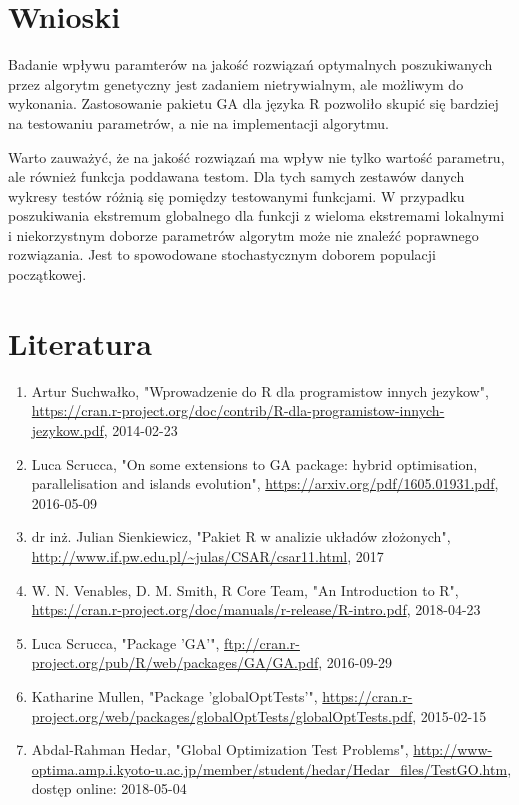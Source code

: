 \documentclass{article}
\begin{document}
\section{Wnioski}

Badanie wpływu paramterów na jakość rozwiązań optymalnych poszukiwanych przez algorytm genetyczny jest zadaniem nietrywialnym, ale możliwym do wykonania. Zastosowanie pakietu GA dla języka R pozwoliło skupić się bardziej na testowaniu parametrów, a nie na implementacji algorytmu.

Warto zauważyć, że na jakość rozwiązań ma wpływ nie tylko wartość parametru, ale również funkcja poddawana testom. Dla tych samych zestawów danych wykresy testów różnią się pomiędzy testowanymi funkcjami. W przypadku poszukiwania ekstremum globalnego dla funkcji z wieloma ekstremami lokalnymi i  niekorzystnym doborze parametrów  algorytm  może nie znaleźć poprawnego rozwiązania. Jest to spowodowane stochastycznym doborem populacji początkowej.



\section{Literatura}
\begin{enumerate}
\item Artur Suchwałko, "Wprowadzenie do R dla programistow innych jezykow", \url{https://cran.r-project.org/doc/contrib/R-dla-programistow-innych-jezykow.pdf}, 2014-02-23
\item Luca Scrucca, "On some extensions to GA package:
hybrid optimisation, parallelisation and islands evolution", \url{https://arxiv.org/pdf/1605.01931.pdf}, 2016-05-09
\item dr inż. Julian Sienkiewicz, "Pakiet R w analizie układów złożonych", \url{http://www.if.pw.edu.pl/~julas/CSAR/csar11.html}, 2017
\item W. N. Venables, D. M. Smith, R Core Team, "An Introduction to R", \url{https://cran.r-project.org/doc/manuals/r-release/R-intro.pdf}, 2018-04-23
\item Luca Scrucca, "Package 'GA'", \url{ftp://cran.r-project.org/pub/R/web/packages/GA/GA.pdf}, 2016-09-29
\item Katharine Mullen, "Package 'globalOptTests'", \url{https://cran.r-project.org/web/packages/globalOptTests/globalOptTests.pdf},
2015-02-15
\item Abdal-Rahman Hedar, "Global Optimization Test Problems", \url{http://www-optima.amp.i.kyoto-u.ac.jp/member/student/hedar/Hedar_files/TestGO.htm}, dostęp online: 2018-05-04
\end{enumerate}
\end{document}

